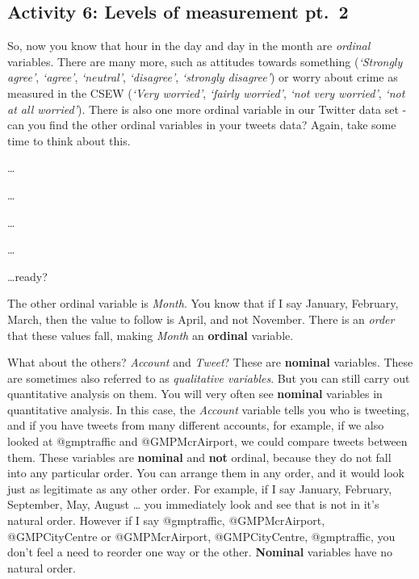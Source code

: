 \documentclass[
]{book}
\begin{document}
\hypertarget{activity-6-levels-of-measurement-pt.-2}{%
\subsection{Activity 6: Levels of measurement pt.~2}\label{activity-6-levels-of-measurement-pt.-2}}

So, now you know that hour in the day and day in the month are \emph{ordinal} variables. There are many more, such as attitudes towards something (\emph{`Strongly agree'}, \emph{`agree'}, \emph{`neutral'}, \emph{`disagree'}, \emph{`strongly disagree'}) or worry about crime as measured in the CSEW (\emph{`Very worried'}, \emph{`fairly worried'}, \emph{`not very worried'}, \emph{`not at all worried'}). There is also one more ordinal variable in our Twitter data set - can you find the other ordinal variables in your tweets data? Again, take some time to think about this.

\ldots{}

\ldots{}

\ldots{}

\ldots{}

\ldots ready?

The other ordinal variable is \emph{Month}. You know that if I say January, February, March, then the value to follow is April, and not November. There is an \emph{order} that these values fall, making \emph{Month} an \textbf{ordinal} variable.

What about the others? \emph{Account} and \emph{Tweet}? These are \textbf{nominal} variables. These are sometimes also referred to as \emph{qualitative variables}. But you can still carry out quantitative analysis on them. You will very often see \textbf{nominal} variables in quantitative analysis. In this case, the \emph{Account} variable tells you who is tweeting, and if you have tweets from many different accounts, for example, if we also looked at @gmptraffic and @GMPMcrAirport, we could compare tweets between them. These variables are \textbf{nominal} and \textbf{not} ordinal, because they do not fall into any particular order. You can arrange them in any order, and it would look just as legitimate as any other order. For example, if I say January, February, September, May, August \ldots{} you immediately look and see that is not in it's natural order. However if I say @gmptraffic, @GMPMcrAirport, @GMPCityCentre or @GMPMcrAirport, @GMPCityCentre, @gmptraffic, you don't feel a need to reorder one way or the other. \textbf{Nominal} variables have no natural order.
\end{document}
